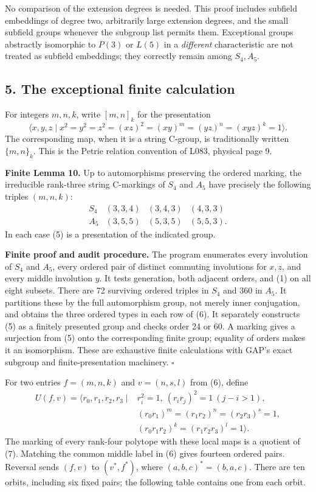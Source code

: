 \documentclass[
  11pt,
  a4paper,
]{article}
\begin{document}
No comparison of the extension degrees is needed. This proof includes
subfield embeddings of degree two, arbitrarily large extension degrees,
and the small subfield groups whenever the subgroup list permits them.
Exceptional groups abstractly isomorphic to \(P(3)\) or \(L(5)\) in a
\emph{different} characteristic are not treated as subfield embeddings;
they correctly remain among \(S_4,A_5\).

\subsection{5. The exceptional finite
calculation}\label{the-exceptional-finite-calculation}

For integers \(m,n,k\), write \([m,n]_k\) for the presentation \[
 \langle x,y,z\mid x^2=y^2=z^2=(xz)^2=(xy)^m=(yz)^n=(xyz)^k=1\rangle.
 \tag{5}
\] The corresponding map, when it is a string C-group, is traditionally
written \(\{m,n\}_k\). This is the Petrie relation convention of L083,
physical page 9.

\textbf{Finite Lemma 10.} Up to automorphisms preserving the ordered
marking, the irreducible rank-three string C-markings of \(S_4\) and
\(A_5\) have precisely the following triples \((m,n,k)\): \[
\begin{array}{c|ccc}
 S_4&(3,3,4)&(3,4,3)&(4,3,3)\\
 A_5&(3,5,5)&(5,3,5)&(5,5,3).
\end{array}
\tag{6}
\] In each case (5) is a presentation of the indicated group.

\textbf{Finite proof and audit procedure.} The program enumerates every
involution of \(S_4\) and \(A_5\), every ordered pair of distinct
commuting involutions for \(x,z\), and every middle involution \(y\). It
tests generation, both adjacent orders, and (1) on all eight subsets.
There are 72 surviving ordered triples in \(S_4\) and 360 in \(A_5\). It
partitions these by the full automorphism group, not merely inner
conjugation, and obtains the three ordered types in each row of (6). It
separately constructs (5) as a finitely presented group and checks order
24 or 60. A marking gives a surjection from (5) onto the corresponding
finite group; equality of orders makes it an isomorphism. These are
exhaustive finite calculations with GAP's exact subgroup and
finite-presentation machinery. \(\square\)

For two entries \(f=(m,n,k)\) and \(v=(n,s,l)\) from (6), define \[
\begin{split}
U(f,v)=\langle r_0,r_1,r_2,r_3\mid &r_i^2=1,\ (r_ir_j)^2=1\ (j-i>1),\\
 &(r_0r_1)^m=(r_1r_2)^n=(r_2r_3)^s=1,\\
 &(r_0r_1r_2)^k=(r_1r_2r_3)^l=1\rangle.
\end{split}\tag{7}
\] The marking of every rank-four polytope with these local maps is a
quotient of (7). Matching the common middle label in (6) gives fourteen
ordered pairs. Reversal sends \((f,v)\) to \((v^*,f^*)\), where
\((a,b,c)^*=(b,a,c)\). There are ten orbits, including six fixed pairs;
the following table contains one from each orbit.
\end{document}
